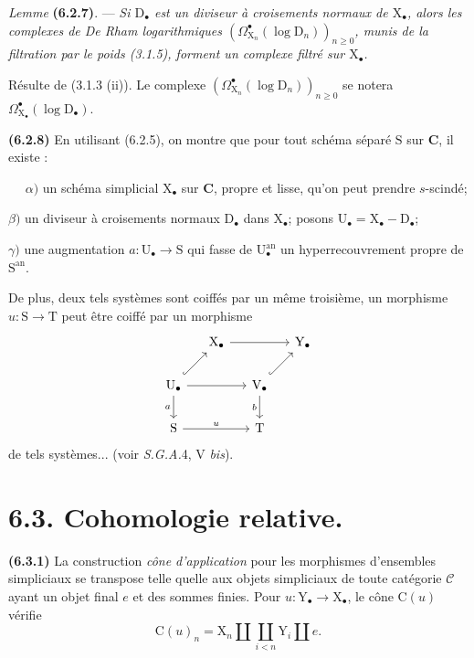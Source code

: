 \documentclass[11pt,leqno]{article}
\newcommand{\Page}[1]{\ifvmode\noindent\else\unskip\ \fi{\footnotesize\textcolor{gray}{[p.\,#1]}}\ \ignorespaces}
\begin{document}
\textit{Lemme} \textbf{(6.2.7)}. — \textit{Si \(\mathrm{D}_{\bullet}\) est un diviseur à croisements normaux de \(\mathrm{X}_{\bullet}\), alors les complexes de De Rham logarithmiques \((\Omega_{\mathrm{X}_n}^{\bullet}(\log\mathrm{D}_n))_{n\geq 0}\), munis de la filtration par le poids \textup{(3.1.5)}, forment un complexe filtré sur \(\mathrm{X}_{\bullet}\).}

Résulte de (3.1.3 (ii)). Le complexe \((\Omega_{\mathrm{X}_n}^{\bullet}(\log\mathrm{D}_n))_{n\geq 0}\) se notera \(\Omega_{\mathrm{X}_{\bullet}}^{\bullet}(\log\mathrm{D}_{\bullet})\).

\textbf{(6.2.8)} En utilisant (6.2.5), on montre que pour tout schéma séparé \(\mathrm{S}\) sur \(\mathbf{C}\), il existe :

\Page{21}
\noindent
\(\alpha)\) un schéma simplicial \(\mathrm{X}_{\bullet}\) sur \(\mathbf{C}\), propre et lisse, qu’on peut prendre \(s\)-scindé;

\noindent
\(\beta)\) un diviseur à croisements normaux \(\mathrm{D}_{\bullet}\) dans \(\mathrm{X}_{\bullet}\); posons \(\mathrm{U}_{\bullet}=\mathrm{X}_{\bullet}-\mathrm{D}_{\bullet}\);

\noindent
\(\gamma)\) une augmentation \(a:\mathrm{U}_{\bullet}\to\mathrm{S}\) qui fasse de \(\mathrm{U}_{\bullet}^{\mathrm{an}}\) un hyperrecouvrement propre de \(\mathrm{S}^{\mathrm{an}}\).

De plus, deux tels systèmes sont coiffés par un même troisième, un morphisme \(u:\mathrm{S}\to\mathrm{T}\) peut être coiffé par un morphisme
\[
\begin{tikzcd}[column sep=1.3em,row sep=1.8em]
& \mathrm{X}_{\bullet} \arrow[rr] & & \mathrm{Y}_{\bullet} \\
\mathrm{U}_{\bullet} \arrow[ur,hook] \arrow[rr] \arrow[d,"a"']
& & \mathrm{V}_{\bullet} \arrow[ur,hook] \arrow[d,"b"'] & \\
\mathrm{S} \arrow[rr,"u"] & & \mathrm{T} &
\end{tikzcd}
\]
de tels systèmes... (voir \textit{S.G.A.}4, V \textit{bis}).

\section*{6.3. Cohomologie relative.}

\textbf{(6.3.1)} La construction \textit{cône d’application} pour les morphismes d’ensembles simpliciaux se transpose telle quelle aux objets simpliciaux de toute catégorie \(\mathscr{C}\) ayant un objet final \(e\) et des sommes finies. Pour \(u:\mathrm{Y}_{\bullet}\to\mathrm{X}_{\bullet}\), le cône \(\mathrm{C}(u)\) vérifie
\[
\mathrm{C}(u)_n
=\mathrm{X}_n\amalg\coprod_{i<n}\mathrm{Y}_i\amalg e.
\]
\end{document}
